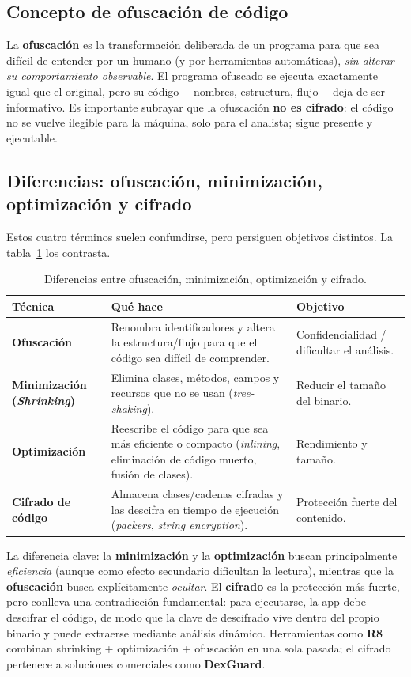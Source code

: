 \documentclass[12pt,letterpaper]{article}
\begin{document}
\subsection{Concepto de ofuscación de código}

La \textbf{ofuscación} es la transformación deliberada de un programa para que
sea difícil de entender por un humano (y por herramientas automáticas),
\emph{sin alterar su comportamiento observable}. El programa ofuscado se ejecuta
exactamente igual que el original, pero su código —nombres, estructura, flujo—
deja de ser informativo. Es importante subrayar que la ofuscación \textbf{no es
cifrado}: el código no se vuelve ilegible para la máquina, solo para el analista;
sigue presente y ejecutable.

\subsection{Diferencias: ofuscación, minimización, optimización y cifrado}

Estos cuatro términos suelen confundirse, pero persiguen objetivos distintos.
La tabla~\ref{tab:conceptos} los contrasta.

\begin{table}[h]
\centering
\caption{Diferencias entre ofuscación, minimización, optimización y cifrado.}
\label{tab:conceptos}
\renewcommand{\arraystretch}{1.3}
\begin{tabularx}{\linewidth}{>{\bfseries}l X l}
\toprule
Técnica & Qué hace & Objetivo \\
\midrule
Ofuscación & Renombra identificadores y altera la estructura/flujo para que el código sea difícil de comprender. & Confidencialidad / dificultar el análisis. \\
Minimización (\emph{Shrinking}) & Elimina clases, métodos, campos y recursos que no se usan (\emph{tree-shaking}). & Reducir el tamaño del binario. \\
Optimización & Reescribe el código para que sea más eficiente o compacto (\emph{inlining}, eliminación de código muerto, fusión de clases). & Rendimiento y tamaño. \\
Cifrado de código & Almacena clases/cadenas cifradas y las descifra en tiempo de ejecución (\emph{packers}, \emph{string encryption}). & Protección fuerte del contenido. \\
\bottomrule
\end{tabularx}
\end{table}

La diferencia clave: la \textbf{minimización} y la \textbf{optimización} buscan
principalmente \emph{eficiencia} (aunque como efecto secundario dificultan la
lectura), mientras que la \textbf{ofuscación} busca explícitamente
\emph{ocultar}. El \textbf{cifrado} es la protección más fuerte, pero conlleva
una contradicción fundamental: para ejecutarse, la app debe descifrar el código,
de modo que la clave de descifrado vive dentro del propio binario y puede
extraerse mediante análisis dinámico. Herramientas como \textbf{R8} combinan
shrinking + optimización + ofuscación en una sola pasada; el cifrado pertenece a
soluciones comerciales como \textbf{DexGuard}.
\end{document}

